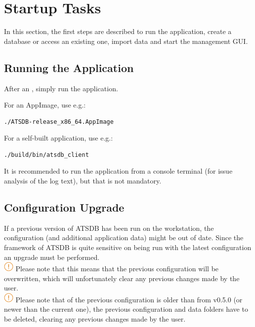 \chapter{Startup Tasks}
\label{sec:tasks} 

In this section, the first steps are described to run the application, create a database or access an existing one, import data and start the management GUI.

\section{Running the Application}

After an , simply run the application.

For an AppImage, use e.g.:
\begin{lstlisting}
./ATSDB-release_x86_64.AppImage
\end{lstlisting}

For a self-built application, use e.g.:
\begin{lstlisting}
./build/bin/atsdb_client
\end{lstlisting}

It is recommended to run the application from a console terminal (for issue analysis of the log text), but that is not mandatory.

\section{Configuration Upgrade}

If a previous version of ATSDB has been run on the workstation, the configuration (and additional application data) might be out of date. Since the framework of ATSDB is quite sensitive on being run with the latest configuration an upgrade must be performed. \\

\includegraphics[width=0.5cm]{../../data/icons/hint.png} Please note that this means that the previous configuration will be overwritten, which will unfortunately clear any previous changes made by the user. \\

\includegraphics[width=0.5cm]{../../data/icons/hint.png} Please note that of the previous configuration is older than from v0.5.0 (or newer than the current one), the previous configuration and data folders have to be deleted, clearing any previous changes made by the user. \\

